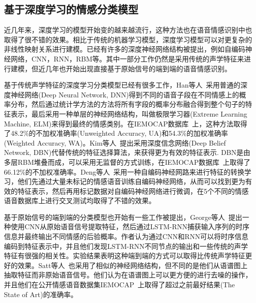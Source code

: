 \subsection{基于深度学习的情感分类模型}
\label{ssec:dnn_cls}

近几年来，深度学习的模型开始变的越来越流行，这种方法也在语音情感识别中也取得了很不错的效果。相比于传统的机器学习模型，深度学习模型可以对更复杂的非线性映射关系进行建模。已经有许多的深度神经网络结构被提出，例如自编码神经网络，CNN，RNN，RBM等。其中一部分工作仍然是采用传统的声学特征来进行建模，但近几年也开始出现直接基于原始信号的端到端的语音情感识别。

基于传统声学特征的深度学习分类模型已经有很多工作，Han等人~\cite{Han2014Speech}采用普通的深度神经网络(Deep Neural Network, DNN)得到不同的语音子段在不同情感上的概率分布，然后通过统计学方法的方法将所有字段的概率分布融合得到整个句子的特征表示，最后采用一种单层的神经网络结构，叫做极限学习器(Extreme Learning Machine, ELM)来得到最终的情感类别。在IEMOCAP数据库~\cite{Busso2008IEMOCAP}上，这种方法取得了48.2\%的不加权准确率(Unweighted Accuracy, UA)和54.3\%的加权准确率(Weighted Accuracy, WA)。Kim等人~\cite{Kim2013Deep}提出采用深度信念网络(Deep Belief Network, DBN)代替传统的特征选择算法，来获得更为有效的特征表示. DBN是由多层RBM堆叠而成，可以采用无监督的方式训练，在IEMOCAP数据库~\cite{Busso2008IEMOCAP}上取得了66.12\%的不加权准确率。Deng等人~\cite{Deng2013Sparse}采用一种自编码神经网路来进行特征的转换学习，他们先通过大量未标记的情感语音训练自编码神经网络，从而可以找到更为有效的特征表示，然后再用标记数据对自编码神经网络进行微调，在5个不同的情感语音数据库上进行交叉测试均取得了不错的效果。

基于原始信号的端到端的分类模型也开始有一些工作被提出，George等人~\cite{Trigeorgis2016Adieu}提出一种使用CNN从原始语音信号提取特征，然后通过LSTM-RNN捕获输入序列的时序信息并最终输出不同情感的后验概率。作者认为通过CNN和RNN可以将时序信息编码到特征表示中，并且他们发现LSTM-RNN不同节点的输出和一些传统的声学特征有很强的相关性。实验结果表明这种端到端的方式可以取得比传统声学特征更好的效果。Satt等人~\cite{Satt2017Efficient}也采用了相似的神经网络结构，但不同的是他们从语谱图上抽取特征而非原始语音信号。他们认为在语谱图上可以更方便的进行去噪的操作，并且他们在公开情感语音数据集IEMOCAP~\cite{Busso2008IEMOCAP}上取得了超过之前最好结果(The State of Art)的准确率。


